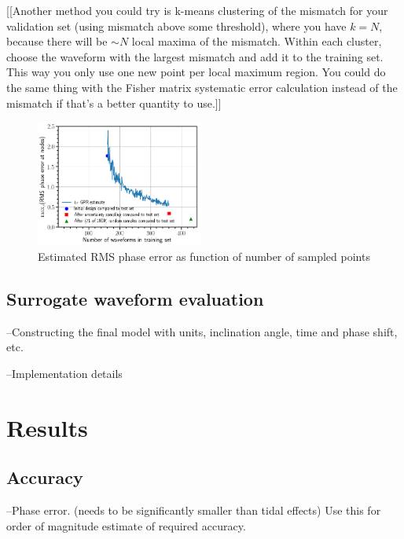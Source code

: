 \documentclass[prd,aps,letter,twocolumn,floatfix,notitlepage]{revtex4-1}
\begin{document}
[[Another method you could try is k-means clustering of the mismatch for your validation set (using mismatch above some threshold), 
where you have $k=N$, because there will
be $\sim N$ local maxima of the mismatch. Within each cluster, choose the waveform with the largest mismatch and add it to the
training set. This way you only use one new point per local maximum region. You could do the same thing with the Fisher matrix
systematic error calculation instead of the mismatch if that's a better quantity to use.]]

\begin{figure}[htb]
\centering
\includegraphics[width=0.49\textwidth]{uncertaintysampling.png}
\caption{Estimated RMS phase error as function of number of sampled points}
\label{fig:phaserange}
\end{figure}


\subsection{Surrogate waveform evaluation}

--Constructing the final model with units, inclination angle, time and phase shift, etc.

--Implementation details


\section{Results}

\subsection{Accuracy}

--Phase error. (needs to be significantly smaller than tidal effects) Use this for order of magnitude estimate of required
accuracy.
\end{document}
